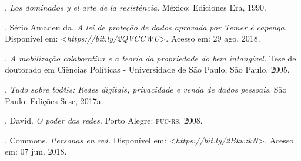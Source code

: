 \begin{bibliohedra}
\titidem. \emph{Los dominados y el arte de la resistência}.
México: Ediciones Era, 1990.

, Sério Amadeu da. \emph{A lei de proteção de dados aprovada
por Temer é capenga.} Disponível em: \textless{}\emph{https://bit.ly/2QVCCWU}\textgreater{}. Acesso em: 29 ago. 2018.

\titidem. \emph{A mobilização colaborativa e a
teoria da propriedade do bem intangível.} Tese de doutorado em Ciências
Políticas - Universidade de São Paulo, São Paulo, 2005.

\titidem. \emph{Tudo sobre tod@s: Redes digitais,
privacidade e venda de dados pessoais}. São Paulo: Edições Sesc, 2017a.

, David. \emph{O poder das redes}. Porto Alegre: \textsc{puc-rs}, 2008.

, Commons. \emph{Personas en red.} Disponível em:
\textless{}\emph{https://bit.ly/2BkwzkN}\textgreater{}. Acesso em: 07 jun. 2018.
\end{bibliohedra}